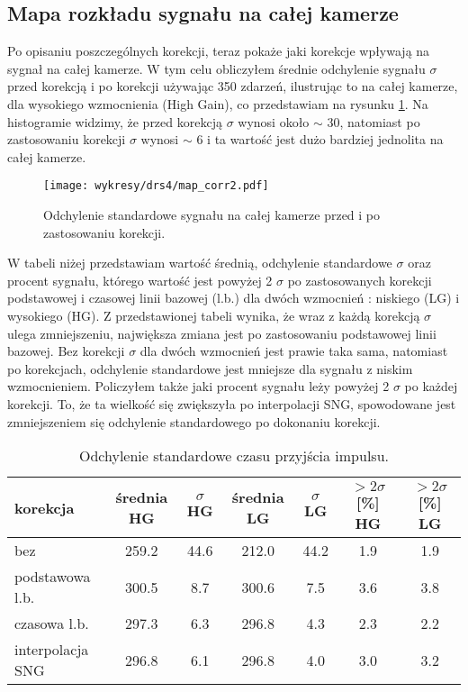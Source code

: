 \documentclass[a4paper,11pt,twoside]{article}
\begin{document}
\subsection{Mapa rozkładu sygnału na całej kamerze}
Po opisaniu poszczególnych korekcji, teraz pokaże jaki korekcje wpływają na sygnał na całej kamerze. W tym celu obliczyłem średnie odchylenie sygnału $\sigma$ przed korekcją i po korekcji używając 350 zdarzeń, ilustrując to na całej kamerze, dla  wysokiego wzmocnienia (High Gain), co przedstawiam na rysunku \ref{fig:map_cam_corr}. Na histogramie widzimy, że przed korekcją $\sigma$ wynosi około $\sim$ 30, natomiast po zastosowaniu korekcji $\sigma$ wynosi $\sim$ 6 i ta wartość jest dużo bardziej jednolita na całej kamerze.
\begin{figure}[H] 
\centering
\texttt{[image: wykresy/drs4/map\_corr2.pdf]}
\caption{Odchylenie standardowe sygnału na całej kamerze przed i po zastosowaniu korekcji.}
\label{fig:map_cam_corr}
\end{figure}
W tabeli niżej przedstawiam wartość średnią, odchylenie standardowe $\sigma$ oraz procent sygnału, którego wartość jest powyżej 2 $\sigma$ po zastosowanych korekcji podstawowej i czasowej linii bazowej (l.b.) dla dwóch wzmocnień : niskiego (LG) i wysokiego (HG). Z przedstawionej tabeli wynika, że wraz z każdą korekcją $\sigma$ ulega zmniejszeniu, największa zmiana jest po zastosowaniu podstawowej linii bazowej. Bez korekcji $\sigma$ dla dwóch wzmocnień jest prawie taka sama, natomiast po korekcjach, odchylenie standardowe jest mniejsze dla sygnału z niskim wzmocnieniem. Policzyłem także jaki procent sygnału leży powyżej 2 $\sigma$ po każdej korekcji.    
To, że ta wielkość się zwiększyła po interpolacji SNG, spowodowane jest zmniejszeniem się odchylenie standardowego po dokonaniu korekcji. 
\begin{table}[H]
\caption{Odchylenie standardowe czasu przyjścia impulsu.}
\begin{tabular}{|l|c|c|c|c|c|c|}
\hline
korekcja & średnia HG  & $\sigma$ HG  & średnia LG & $\sigma$ LG & $> 2 \sigma$ [\%] HG & $> 2 \sigma$ [\%] LG \\ \hline
bez  & 259.2  & 44.6  & 212.0 & 44.2 & 1.9 & 1.9  \\ \hline
podstawowa l.b. & 300.5  & 8.7  & 300.6 & 7.5 & 3.6 & 3.8    \\  \hline
czasowa l.b. & 297.3  & 6.3  & 296.8 & 4.3 & 2.3 & 2.2  \\  \hline
interpolacja SNG & 296.8  & 6.1 &  296.8 & 4.0 & 3.0 & 3.2  \\  \hline
\end{tabular}
\label{tab:std}
\end{table}
\end{document}
